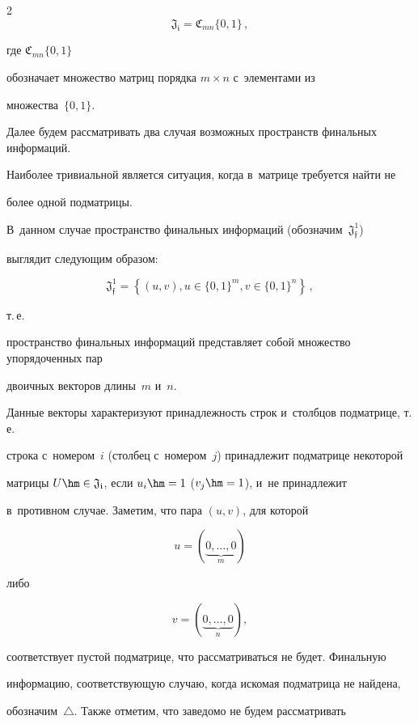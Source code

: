 \begin{multicols}{2}
$$


\mathfrak{J_i} =  \mathfrak{C}_{mn}\{0,1\}\,,$$


где $\mathfrak{C}_{mn}\{0,1\}$ 


обозначает множество матриц порядка $m\times n$ с~элементами из 


множества~$\{0,1\}.$





Далее будем рассматривать два случая возможных пространств финальных информаций.


 Наиболее тривиальной является ситуация, когда в~мат\-ри\-це требуется найти не 


более одной подматрицы.


 В~данном случае пространство финальных информаций (обозначим~$\mathfrak{J_f^1}$) 


 выглядит следующим образом:


$$


\mathfrak{J_f^1} = \left\{(u, v), u \in \{0,1\}^m, v \in \{0,1\}^n\right\}\,,


$$


 т.\,е.\ 


пространство финальных информаций представляет собой множество упорядоченных пар 


двоичных векторов длины~$m$ и~$n$.


Данные векторы характеризуют принадлежность строк и~столбцов подматрице, т.\,е.\ 


строка с~номером~$i$ (столбец с~номером~$j$) принадлежит подматрице некоторой 


мат\-ри\-цы $U \hm\in \mathfrak{J_i}$, если $u_i \hm=1$ ($v_j\hm= 1$), и~не принадлежит 


в~противном случае. Заметим, что пара $(u, v)$, для которой 


$$


u= 


(\underbrace{0,\dots, 0}_m)$$


 либо 


 $$


 v= (\underbrace{0,\dots, 0}_n),$$ 


соответствует пус\-той подматрице, что рассматриваться не будет. Финальную 


информацию, со\-от\-вет\-ст\-ву\-ющую случаю, когда искомая подматрица не найдена, 


обозначим~$\triangle$. Также отметим, что заведомо не будем рассматривать 



\end{multicols}
